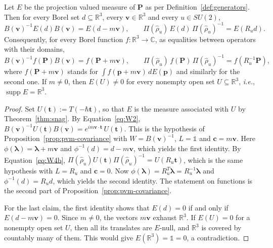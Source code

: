 \begin{lemma}\label{lem:boost-covariance}
	Let $E$ be the projection valued measure of $\mathbf{P}$ as per Definition~\ref{def:generators}. Then for every Borel set $d\subseteq\mathbb{R}^3$, every $\mathbf{v}\in\mathbb{R}^3$ and every $u\in SU(2)$,
	\begin{equation}
		B(\mathbf{v})^{-1}E(d)B(\mathbf{v})=E(d-m\mathbf{v}),\qquad \Pi(\hat\rho_u)\,E(d)\,\Pi(\hat\rho_u)^{-1}=E(R_ud).
	\end{equation}
	Consequently, for every Borel function $f:\mathbb{R}^3\to\mathbb{C}$, as equalities between operators with their domains,
	\begin{equation*}
		B(\mathbf{v})^{-1}f(\mathbf{P})B(\mathbf{v})=f(\mathbf{P}+m\mathbf{v}),\qquad \Pi(\hat\rho_u)\,f(\mathbf{P})\,\Pi(\hat\rho_u)^{-1}=f(R_u^{-1}\mathbf{P}),
	\end{equation*}
	where $f(\mathbf{P}+m\mathbf{v})$ stands for $\int f(\mathbf{p}+m\mathbf{v})\,dE(\mathbf{p})$ and similarly for the second one. If $m\neq0$, then $E(U)\neq0$ for every nonempty open set $U\subseteq\mathbb{R}^3$, \textit{i.e.}, $\operatorname{supp}E=\mathbb{R}^3$.
\end{lemma}

\begin{proof}
	Set $U(\mathbf{t}):=T(-\hbar\mathbf{t})$, so that $E$ is the measure associated with $U$ by Theorem~\ref{thm:snag}. By Equation~\eqref{eq:W2}, $B(\mathbf{v})^{-1}U(\mathbf{t})B(\mathbf{v})=e^{im\mathbf{v}\cdot\mathbf{t}}\,U(\mathbf{t})$. This is the hypothesis of Proposition~\ref{prop:pvm-covariance} with $W=B(\mathbf{v})^{-1}$, $L=\mathbb{1}$ and $\mathbf{c}=m\mathbf{v}$. Here $\phi(\boldsymbol{\lambda})=\boldsymbol{\lambda}+m\mathbf{v}$ and $\phi^{-1}(d)=d-m\mathbf{v}$, which yields the first identity. By Equation~\eqref{eq:W4b}, $\Pi(\hat\rho_u)U(\mathbf{t})\Pi(\hat\rho_u)^{-1}=U(R_u\mathbf{t})$, which is the same hypothesis with $L=R_u$ and $\mathbf{c}=0$. Now $\phi(\boldsymbol{\lambda})=R_u^{T}\boldsymbol{\lambda}=R_u^{-1}\boldsymbol{\lambda}$ and $\phi^{-1}(d)=R_ud$, which yields the second identity. The statement on functions is the second part of Proposition~\ref{prop:pvm-covariance}.
	
	For the last claim, the first identity shows that $E(d)=0$ if and only if $E(d-m\mathbf{v})=0$. Since $m\neq0$, the vectors $m\mathbf{v}$ exhaust $\mathbb{R}^3$. If $E(U)=0$ for a nonempty open set $U$, then all its translates are $E$-null, and $\mathbb{R}^3$ is covered by countably many of them. This would give $E(\mathbb{R}^3)=\mathbb{1}=0$, a contradiction.
\end{proof}


